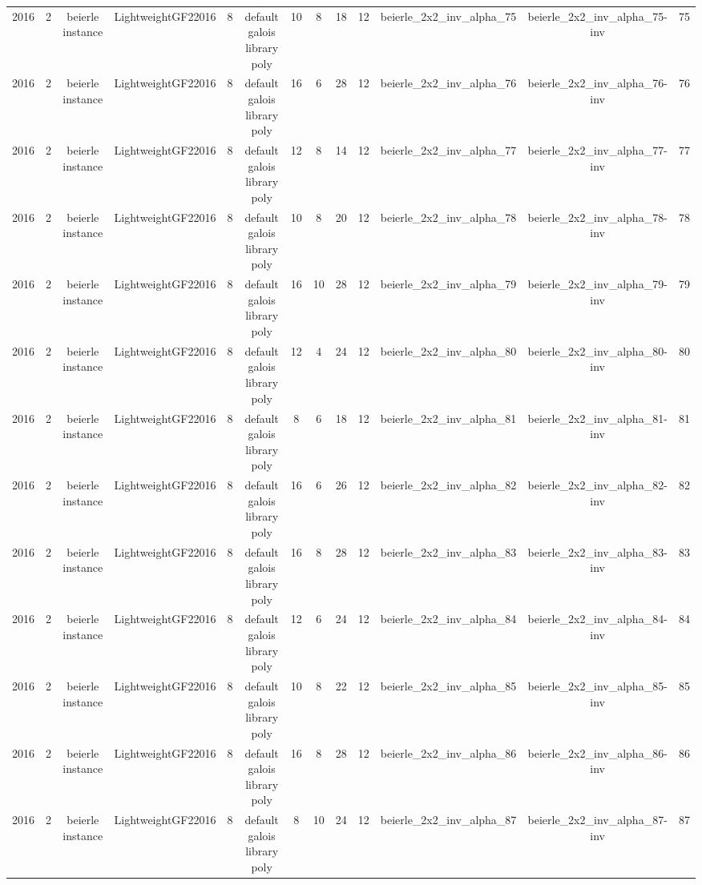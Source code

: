 \begin{tabular}{c c c c c c c c c c c c c}
2016 & 2 & beierle instance & LightweightGF22016 & 8 & default galois library poly & 10 & 8 & 18 & 12 & beierle_2x2_inv_alpha_75 & beierle_2x2_inv_alpha_75-inv & 75 \\
2016 & 2 & beierle instance & LightweightGF22016 & 8 & default galois library poly & 16 & 6 & 28 & 12 & beierle_2x2_inv_alpha_76 & beierle_2x2_inv_alpha_76-inv & 76 \\
2016 & 2 & beierle instance & LightweightGF22016 & 8 & default galois library poly & 12 & 8 & 14 & 12 & beierle_2x2_inv_alpha_77 & beierle_2x2_inv_alpha_77-inv & 77 \\
2016 & 2 & beierle instance & LightweightGF22016 & 8 & default galois library poly & 10 & 8 & 20 & 12 & beierle_2x2_inv_alpha_78 & beierle_2x2_inv_alpha_78-inv & 78 \\
2016 & 2 & beierle instance & LightweightGF22016 & 8 & default galois library poly & 16 & 10 & 28 & 12 & beierle_2x2_inv_alpha_79 & beierle_2x2_inv_alpha_79-inv & 79 \\
2016 & 2 & beierle instance & LightweightGF22016 & 8 & default galois library poly & 12 & 4 & 24 & 12 & beierle_2x2_inv_alpha_80 & beierle_2x2_inv_alpha_80-inv & 80 \\
2016 & 2 & beierle instance & LightweightGF22016 & 8 & default galois library poly & 8 & 6 & 18 & 12 & beierle_2x2_inv_alpha_81 & beierle_2x2_inv_alpha_81-inv & 81 \\
2016 & 2 & beierle instance & LightweightGF22016 & 8 & default galois library poly & 16 & 6 & 26 & 12 & beierle_2x2_inv_alpha_82 & beierle_2x2_inv_alpha_82-inv & 82 \\
2016 & 2 & beierle instance & LightweightGF22016 & 8 & default galois library poly & 16 & 8 & 28 & 12 & beierle_2x2_inv_alpha_83 & beierle_2x2_inv_alpha_83-inv & 83 \\
2016 & 2 & beierle instance & LightweightGF22016 & 8 & default galois library poly & 12 & 6 & 24 & 12 & beierle_2x2_inv_alpha_84 & beierle_2x2_inv_alpha_84-inv & 84 \\
2016 & 2 & beierle instance & LightweightGF22016 & 8 & default galois library poly & 10 & 8 & 22 & 12 & beierle_2x2_inv_alpha_85 & beierle_2x2_inv_alpha_85-inv & 85 \\
2016 & 2 & beierle instance & LightweightGF22016 & 8 & default galois library poly & 16 & 8 & 28 & 12 & beierle_2x2_inv_alpha_86 & beierle_2x2_inv_alpha_86-inv & 86 \\
2016 & 2 & beierle instance & LightweightGF22016 & 8 & default galois library poly & 8 & 10 & 24 & 12 & beierle_2x2_inv_alpha_87 & beierle_2x2_inv_alpha_87-inv & 87 \\

\end{tabular}
